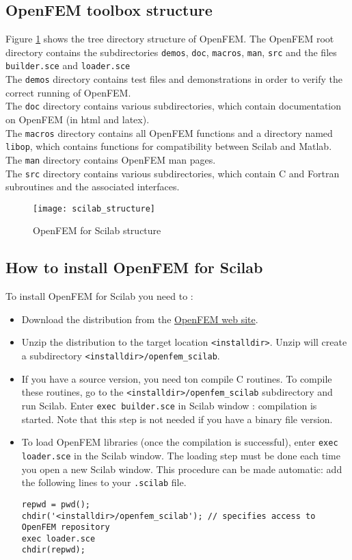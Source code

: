 
\subsection{OpenFEM toolbox structure}
Figure \ref{structure} shows the tree directory structure of OpenFEM. The OpenFEM root directory contains the subdirectories \verb+demos+, \verb+doc+, \verb+macros+, \verb+man+, \verb+src+ and the files \verb+builder.sce+ and \verb+loader.sce+\\
The \verb+demos+ directory contains test files and demonstrations in order to verify the correct running of OpenFEM.\\  
The \verb+doc+ directory contains various subdirectories, which contain documentation on OpenFEM (in html and latex).\\
The \verb+macros+ directory contains all OpenFEM functions and a directory named \verb+libop+, which contains functions for compatibility between Scilab and Matlab.\\
The \verb+man+ directory contains OpenFEM man pages.\\
The \verb+src+ directory contains various subdirectories, which contain C and Fortran subroutines and the associated interfaces.
\begin{figure}[!hbp]
\begin{center}
\texttt{[image: scilab\_structure]}
\caption{OpenFEM for Scilab structure}
\label{structure}
\end{center}
\end{figure}
\subsection{How to install OpenFEM for Scilab}



To install OpenFEM for Scilab you need to :
\begin{itemize}
\item Download the distribution from the \href{http://www-rocq.inria.fr/OpenFEM}{OpenFEM web site}.
\item Unzip the distribution to the target location {\tt <installdir>}. Unzip will create a subdirectory {\tt <installdir>/openfem\_scilab}.
\item If you have a source version, you need ton compile C routines. To compile these routines, go to the  {\tt <installdir>/openfem\_scilab} subdirectory and run Scilab. Enter {\tt exec builder.sce} in Scilab window : compilation is started. Note that this step is not needed if you have a binary file version.
\item To load OpenFEM libraries (once the compilation is successful), enter {\tt exec loader.sce} in the Scilab window. The loading step must be done each time you open a new Scilab window. This procedure can be made automatic: add the following lines to your {\tt .scilab} file.
\begin{verbatim}
repwd = pwd();
chdir('<installdir>/openfem_scilab'); // specifies access to OpenFEM repository
exec loader.sce
chdir(repwd);
\end{verbatim}
\end{itemize}



